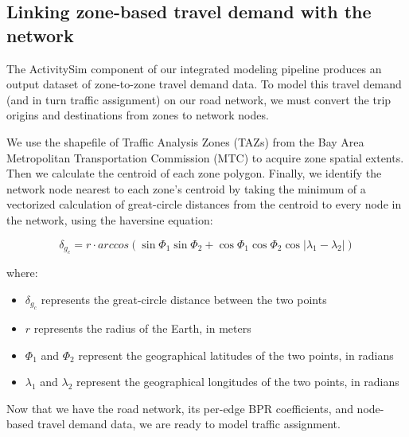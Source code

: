 \subsection{Linking zone-based travel demand with the network}

The ActivitySim component of our integrated modeling pipeline produces an output dataset of zone-to-zone travel demand data. To model this travel demand (and in turn traffic assignment) on our road network, we must convert the trip origins and destinations from zones to network nodes.

We use the shapefile of Traffic Analysis Zones (TAZs) from the Bay Area Metropolitan Transportation Commission (MTC) to acquire zone spatial extents. Then we calculate the centroid of each zone polygon. Finally, we identify the network node nearest to each zone's centroid by taking the minimum of a vectorized calculation of great-circle distances from the centroid to every node in the network, using the haversine equation:

\bigskip
\begin{equation}
    \delta_g_c = r\cdot arccos(\sin{\Phi_1} \sin{\Phi_2} + \cos{\Phi_1} \cos{\Phi_2} \cos{|\lambda_1 - \lambda_2|})
    \label{eq:haversine_formula}
\end{equation}

\bigskip
where:

\bigskip
\begin{itemize}
    \item $\delta_g_c$ represents the great-circle distance between the two points
    \item $r$ represents the radius of the Earth, in meters
    \item $\Phi_1$ and $\Phi_2$ represent the geographical latitudes of the two points, in radians
    \item $\lambda_1$ and $\lambda_2$ represent the geographical longitudes of the two points, in radians
\end{itemize}

\bigskip
Now that we have the road network, its per-edge BPR coefficients, and node-based travel demand data, we are ready to model traffic assignment.
    